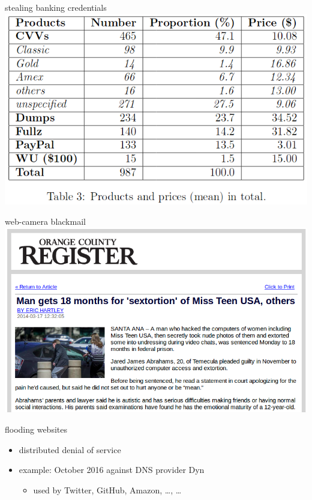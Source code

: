 \usetikzlibrary{calc}

\begin{frame}{stealing banking credentials}
\includegraphics[width=\textwidth]{../intro/all-your-cards-tbl3}
\end{frame}

\begin{frame}{web-camera blackmail}
\includegraphics[width=\textwidth]{../intro/oc-sext-head}
\end{frame}

\begin{frame}{flooding websites}
    \begin{itemize}
    \item distributed denial of service
    \item example: October 2016 against DNS provider Dyn
        \begin{itemize}
        \item used by Twitter, GitHub, Amazon, \ldots, \ldots
        \end{itemize}
    \end{itemize}
\end{frame}

